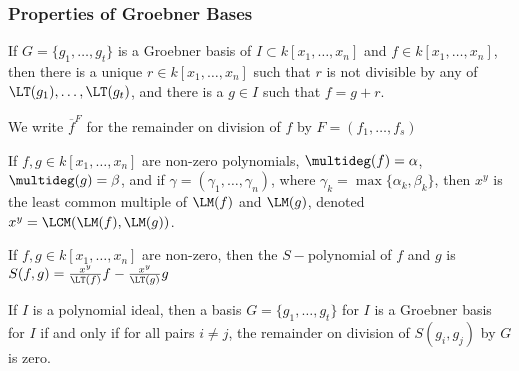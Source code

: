 \documentclass[crop=false,class=article,oneside]{standalone}
\begin{document}
        \subsubsection{Properties of Groebner Bases}
        \begin{theorem}
        If $G=\{g_1,\hdots, g_t\}$ is a Groebner basis of $I\subset k[x_1,\hdots ,x_n]$ and $f\in k[x_1,\hdots ,x_n]$, then there is a unique $r\in k[x_1,\hdots ,x_n]$ such that $r$ is not divisible by any of $\LT(g_1),\hdots, \LT(g_t)$, and there is a $g\in I$ such that $f = g+r$. 
        \end{theorem}
        \begin{notation}
        We write $\overline{f}^{F}$ for the remainder on division of $f$ by $F = (f_{1},\hdots,f_{s})$
        \end{notation}
        \begin{definition}
        If $f,g\in k[x_1,\hdots ,x_n]$ are non-zero polynomials, $\multideg(f) = \alpha$, $\multideg(g) = \beta$, and if $\gamma = (\gamma_1,\hdots, \gamma_n)$, where $\gamma_k = \max\{\alpha_k,\beta_k\}$, then $x^y$ is the least common multiple of $\LM(f)$ and $\LM(g)$, denoted $x^y = \LCM(\LM(f),\LM(g))$.
        \end{definition}
        \begin{definition}
        If $f,g\in k[x_1,\hdots ,x_n]$ are non-zero, then the $S-$polynomial of $f$ and $g$ is $S(f,g) = \frac{x^y}{\LT(f)}f - \frac{x^y}{\LT(g)}g$
        \end{definition}
        \begin{theorem}
        If $I$ is a polynomial ideal, then a basis $G=\{g_1,\hdots, g_t\}$ for $I$ is a Groebner basis for $I$ if and only if for all pairs $i\ne j$, the remainder on division of $S(g_i,g_j)$ by $G$ is zero.
        \end{theorem}
\end{document}
